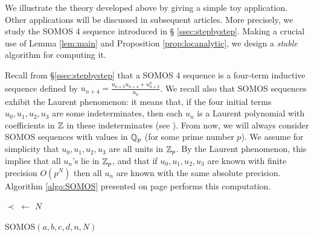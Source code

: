 \documentclass{lms}
\begin{document}
We illustrate the theory developed above by giving a simple 
toy application. Other applications will be discussed in subsequent 
articles. More precisely, we study the SOMOS 4 sequence introduced in \S 
\ref{ssec:stepbystep}. Making a crucial use of Lemma \ref{lem:main} and 
Proposition \ref{prop:locanalytic}, we design a \emph{stable} algorithm 
for computing it.

Recall from \S \ref{ssec:stepbystep} that a SOMOS 4 sequence is a 
four-term inductive sequence defined by $u_{n+4} = \frac{u_{n+2} u_{n+4} 
+ u_{n+3}^3}{u_n}$. We recall also that SOMOS sequences exhibit the 
Laurent phenomenon: it means that, if the four initial terms $u_0, u_1, 
u_2, u_3$ are some indeterminates, then each $u_n$ is a Laurent 
polynomial with coefficients in $\mathbb Z$ in these indeterminates
(see \cite{fomin-zelevinsky:02a}).
From now, we will always consider SOMOS sequences with values in $\mathbb Q_p$ 
(for some prime number $p$). We assume for simplicity that $u_0, u_1, u_2, 
u_3$ are all units in $\mathbb Z_p$. By the Laurent phenomenon, this implies 
that all $u_n$'s lie in $\mathbb Z_p$, and that if $u_0, u_1, u_2, u_3$ 
are known with finite precision $O(p^N)$ then all $u_n$ are 
known with the same absolute precision. Algorithm \ref{algo:SOMOS} presented on 
page \pageref{algo:SOMOS} performs this computation.

\begin{algorithm}[t]
\BlankLine
$\prec$ $\leftarrow$ $N$\;
\;
\caption{\sc SOMOS$(a, b, c, d, n, N)$}\label{algo:SOMOS}
\end{algorithm}
\end{document}
